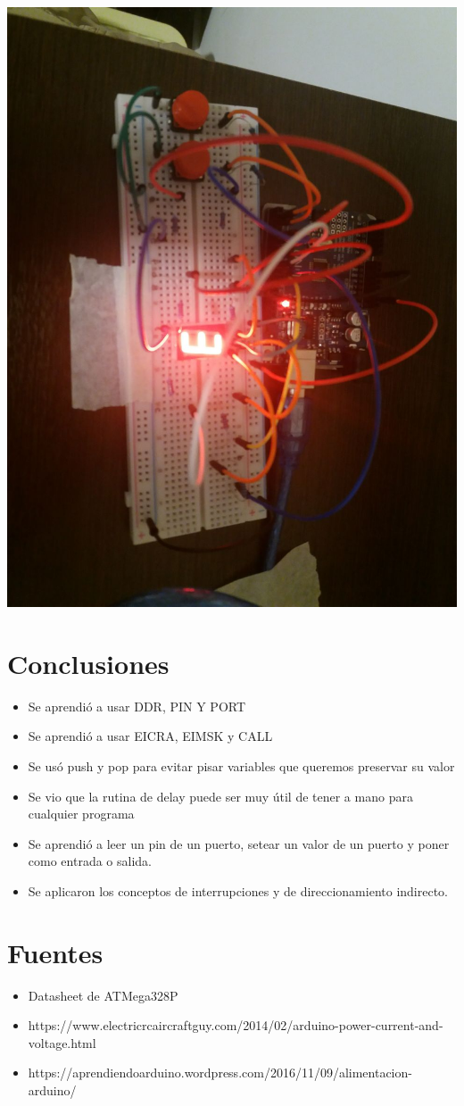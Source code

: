 \begin{center}
\includegraphics[width=\linewidth]{imagenes/photo5008481670650767806.jpg}
\end{center}


\section{Conclusiones}\label{sec:conclusion}

\begin{itemize}
    \item Se aprendió a usar DDR, PIN Y PORT
    \item Se aprendió a usar EICRA, EIMSK y CALL
    \item Se usó push y pop para evitar pisar variables que queremos preservar su valor
    \item Se vio que la rutina de delay puede ser muy útil de tener a mano para cualquier programa
    \item Se aprendió a leer un pin de un puerto, setear un valor de un puerto y poner como entrada  o salida.
    \item Se aplicaron los conceptos de interrupciones y de direccionamiento indirecto.
\end{itemize}

\section{Fuentes}

\begin{itemize}
    \item Datasheet de ATMega328P
    \item https://www.electricrcaircraftguy.com/2014/02/arduino-power-current-and-voltage.html
    \item https://aprendiendoarduino.wordpress.com/2016/11/09/alimentacion-arduino/
\end{itemize}